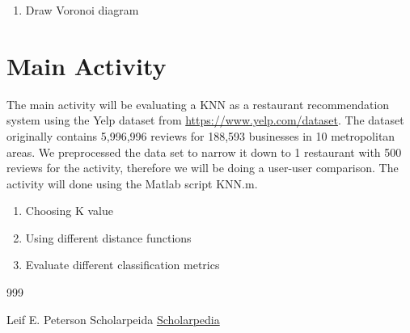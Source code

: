\documentclass{report}
\begin{document}
\begin{enumerate}



\item Draw Voronoi diagram
\end{enumerate}

\section*{Main Activity}

The main activity will be evaluating a KNN as a restaurant recommendation system using the Yelp dataset from \href{https://www.yelp.com/dataset}{https://www.yelp.com/dataset}.
The dataset originally contains 5,996,996 reviews for 188,593 businesses in 10 metropolitan areas.
We preprocessed the data set to narrow it down to 1 restaurant with 500 reviews for the activity, therefore we will be doing a user-user comparison.  
The activity will done using the Matlab script KNN.m.

\begin{enumerate}

\item Choosing K value

\item Using different distance functions

\item Evaluate different classification metrics

\end{enumerate}

\begin {thebibliography}{999}

	Leif E. Peterson
	Scholarpeida
	\href{http://www.scholarpedia.org/article/K-nearest_neighbor}{Scholarpedia}
	
\end{thebibliography}
\end{document}
